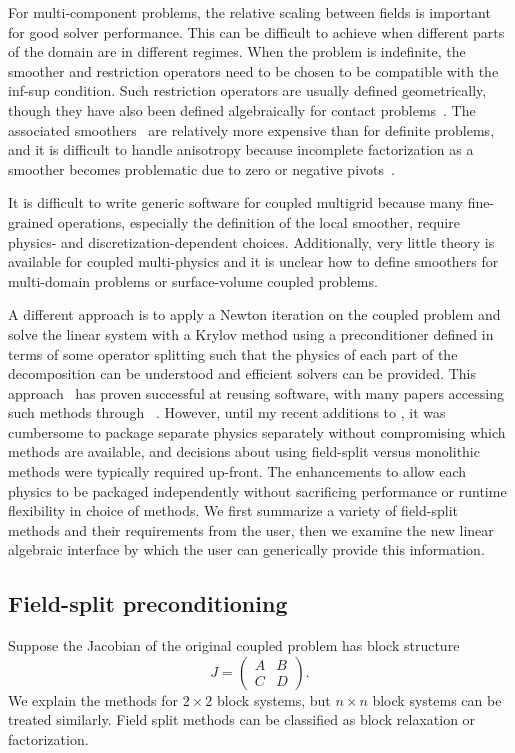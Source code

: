 For multi-component problems, the relative scaling between fields is important for good solver performance.
This can be difficult to achieve when different parts of the domain are in different regimes.
When the problem is indefinite, the smoother and restriction operators need to be chosen to be compatible with the inf-sup condition.
Such restriction operators are usually defined geometrically, though they have also been defined algebraically for contact problems~\citep{adams2004amm}.
The associated smoothers~\citep{vanka1986block} are relatively more expensive than for definite problems, and it is difficult to handle anisotropy because incomplete factorization as a smoother becomes problematic due to zero or negative pivots~\citep{higham2002accuracy,deniet2007solving}.

It is difficult to write generic software for coupled multigrid because many fine-grained operations, especially the definition of the local smoother, require physics- and discretization-dependent choices.
Additionally, very little theory is available for coupled multi-physics and it is unclear how to define smoothers for multi-domain problems or surface-volume coupled problems.

A different approach is to apply a Newton iteration on the coupled problem and solve the linear system with a Krylov method using a preconditioner defined in terms of some operator splitting such that the physics of each part of the decomposition can be understood and efficient solvers can be provided.
This approach~\citep{knoll2004jfn} has proven successful at reusing software, with many papers accessing such methods through {\PETSc}~\citep{petsc-web-page}.
However, until my recent additions to {\PETSc}, it was cumbersome to package separate physics separately without compromising which methods are available, and decisions about using field-split versus monolithic methods were typically required up-front.
The enhancements to {\PETSc} allow each physics to be packaged independently without sacrificing performance or runtime flexibility in choice of methods.
We first summarize a variety of field-split methods and their requirements from the user, then we examine the new linear algebraic interface by which the user can generically provide this information.

\subsection{Field-split preconditioning}\label{sec:multiphysics:fieldsplit}
Suppose the Jacobian of the original coupled problem has block structure
\begin{equation}\label{eq:fieldsplit:jacobian}
  J = \begin{pmatrix} A & B \\ C & D \end{pmatrix} .
\end{equation}
We explain the methods for $2\times 2$ block systems, but $n\times n$ block systems can be treated similarly.
Field split methods can be classified as block relaxation or factorization.

